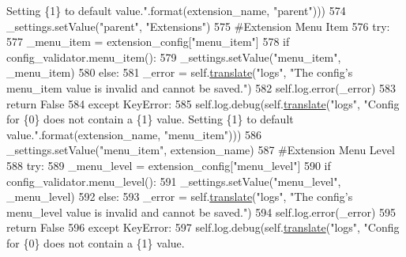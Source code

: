 \begin{DoxyCode}
{       Setting \{1\} to default value."}.format(extension\_name, \textcolor{stringliteral}{"parent"})))
574             \_settings.setValue(\textcolor{stringliteral}{"parent"}, \textcolor{stringliteral}{"Extensions"})
575         \textcolor{comment}{#Extension Menu Item}
576         \textcolor{keywordflow}{try}:
577             \_menu\_item = extension\_config[\textcolor{stringliteral}{"menu\_item"}]
578             \textcolor{keywordflow}{if} config\_validator.menu\_item():
579                 \_settings.setValue(\textcolor{stringliteral}{"menu\_item"}, \_menu\_item)
580             \textcolor{keywordflow}{else}:
581                 \_error = self.\hyperlink{classcommotion__client_1_1utils_1_1extension__manager_1_1ExtensionManager_a2cfd032ca383c3fd6f0f52b99b6dd67c}{translate}(\textcolor{stringliteral}{"logs"}, \textcolor{stringliteral}{"The config's menu\_item value is invalid and
       cannot be saved."})
582                 self.log.error(\_error)
583                 \textcolor{keywordflow}{return} \textcolor{keyword}{False}
584         \textcolor{keywordflow}{except} KeyError:
585             self.log.debug(self.\hyperlink{classcommotion__client_1_1utils_1_1extension__manager_1_1ExtensionManager_a2cfd032ca383c3fd6f0f52b99b6dd67c}{translate}(\textcolor{stringliteral}{"logs"}, \textcolor{stringliteral}{"Config for \{0\} does not contain a \{1\} value.
       Setting \{1\} to default value."}.format(extension\_name, \textcolor{stringliteral}{"menu\_item"})))
586             \_settings.setValue(\textcolor{stringliteral}{"menu\_item"}, extension\_name)
587         \textcolor{comment}{#Extension Menu Level}
588         \textcolor{keywordflow}{try}:
589             \_menu\_level = extension\_config[\textcolor{stringliteral}{"menu\_level"}]
590             \textcolor{keywordflow}{if} config\_validator.menu\_level():
591                 \_settings.setValue(\textcolor{stringliteral}{"menu\_level"}, \_menu\_level)
592             \textcolor{keywordflow}{else}:
593                 \_error = self.\hyperlink{classcommotion__client_1_1utils_1_1extension__manager_1_1ExtensionManager_a2cfd032ca383c3fd6f0f52b99b6dd67c}{translate}(\textcolor{stringliteral}{"logs"}, \textcolor{stringliteral}{"The config's menu\_level value is invalid and
       cannot be saved."})
594                 self.log.error(\_error)
595                 \textcolor{keywordflow}{return} \textcolor{keyword}{False}
596         \textcolor{keywordflow}{except} KeyError:
597             self.log.debug(self.\hyperlink{classcommotion__client_1_1utils_1_1extension__manager_1_1ExtensionManager_a2cfd032ca383c3fd6f0f52b99b6dd67c}{translate}(\textcolor{stringliteral}{"logs"}, \textcolor{stringliteral}{"Config for \{0\} does not contain a \{1\} value.
}
\end{DoxyCode}
